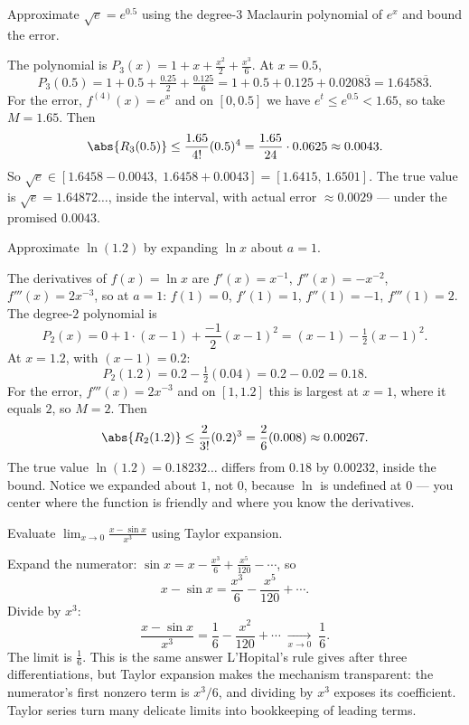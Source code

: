 \begin{example}
\label{ch31:ex-sqrt-e}
Approximate $\sqrt{e} = e^{0.5}$ using the degree-$3$ Maclaurin polynomial of $e^x$
and bound the error.

The polynomial is $P_3(x) = 1 + x + \tfrac{x^2}{2} + \tfrac{x^3}{6}$. At $x=0.5$,
\[
  P_3(0.5) = 1 + 0.5 + \tfrac{0.25}{2} + \tfrac{0.125}{6}
           = 1 + 0.5 + 0.125 + 0.0208\overline{3} = 1.6458\overline{3}.
\]
For the error, $f^{(4)}(x) = e^x$ and on $[0,0.5]$ we have
$e^t \le e^{0.5} < 1.65$, so take $M = 1.65$. Then
\[
  \abs{R_3(0.5)} \le \frac{1.65}{4!}(0.5)^4
  = \frac{1.65}{24}\cdot 0.0625 \approx 0.0043.
\]
So $\sqrt{e} \in [1.6458 - 0.0043,\; 1.6458 + 0.0043] = [1.6415,\, 1.6501]$. The true
value is $\sqrt{e} = 1.64872\ldots$, inside the interval, with actual error
$\approx 0.0029$ --- under the promised $0.0043$.
\end{example}

\begin{example}
\label{ch31:ex-ln}
Approximate $\ln(1.2)$ by expanding $\ln x$ about $a = 1$.

The derivatives of $f(x) = \ln x$ are $f'(x) = x^{-1}$, $f''(x) = -x^{-2}$,
$f'''(x) = 2x^{-3}$, so at $a=1$: $f(1)=0$, $f'(1)=1$, $f''(1)=-1$, $f'''(1)=2$. The
degree-$2$ polynomial is
\[
  P_2(x) = 0 + 1\cdot(x-1) + \frac{-1}{2}(x-1)^2 = (x-1) - \tfrac12(x-1)^2.
\]
At $x = 1.2$, with $(x-1) = 0.2$:
\[
  P_2(1.2) = 0.2 - \tfrac12(0.04) = 0.2 - 0.02 = 0.18.
\]
For the error, $f'''(x) = 2x^{-3}$ and on $[1, 1.2]$ this is largest at $x=1$, where
it equals $2$, so $M = 2$. Then
\[
  \abs{R_2(1.2)} \le \frac{2}{3!}(0.2)^3 = \frac{2}{6}(0.008) \approx 0.00267.
\]
The true value $\ln(1.2) = 0.18232\ldots$ differs from $0.18$ by $0.00232$, inside
the bound. Notice we expanded about $1$, not $0$, because $\ln$ is undefined at $0$ ---
you center where the function is friendly and where you know the derivatives.
\end{example}

\begin{example}
\label{ch31:ex-limit}
Evaluate $\displaystyle\lim_{x\to 0}\frac{x - \sin x}{x^3}$ using Taylor expansion.

Expand the numerator: $\sin x = x - \tfrac{x^3}{6} + \tfrac{x^5}{120} - \cdots$, so
\[
  x - \sin x = \frac{x^3}{6} - \frac{x^5}{120} + \cdots.
\]
Divide by $x^3$:
\[
  \frac{x - \sin x}{x^3} = \frac{1}{6} - \frac{x^2}{120} + \cdots
  \;\xrightarrow[x\to 0]{}\; \frac{1}{6}.
\]
The limit is $\tfrac16$. This is the same answer L'Hopital's rule gives after three
differentiations, but Taylor expansion makes the mechanism transparent: the
numerator's first nonzero term is $x^3/6$, and dividing by $x^3$ exposes its
coefficient. Taylor series turn many delicate limits into bookkeeping of leading
terms.
\end{example}

